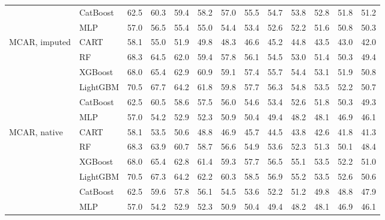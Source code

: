 \begin{table}[p]
\begin{tabular}{@{}llrrrrrrrrrrr@{}}
 & CatBoost & 62.5 & 60.3 & 59.4 & 58.2 & 57.0 & 55.5 & 54.7 & 53.8 & 52.8 & 51.8 & 51.2 \\
 & MLP & 57.0 & 56.5 & 55.4 & 55.0 & 54.4 & 53.4 & 52.6 & 52.2 & 51.6 & 50.8 & 50.3 \\
\midrule
MCAR, imputed & CART & 58.1 & 55.0 & 51.9 & 49.8 & 48.3 & 46.6 & 45.2 & 44.8 & 43.5 & 43.0 & 42.0 \\
 & RF & 68.3 & 64.5 & 62.0 & 59.4 & 57.8 & 56.1 & 54.5 & 53.0 & 51.4 & 50.3 & 49.4 \\
 & XGBoost & 68.0 & 65.4 & 62.9 & 60.9 & 59.1 & 57.4 & 55.7 & 54.4 & 53.1 & 51.9 & 50.8 \\
 & LightGBM & 70.5 & 67.7 & 64.2 & 61.8 & 59.8 & 57.7 & 56.3 & 54.8 & 53.5 & 52.2 & 50.7 \\
 & CatBoost & 62.5 & 60.5 & 58.6 & 57.5 & 56.0 & 54.6 & 53.4 & 52.6 & 51.8 & 50.3 & 49.3 \\
 & MLP & 57.0 & 54.2 & 52.9 & 52.3 & 50.9 & 50.4 & 49.4 & 48.2 & 48.1 & 46.9 & 46.1 \\
\midrule
MCAR, native & CART & 58.1 & 53.5 & 50.6 & 48.8 & 46.9 & 45.7 & 44.5 & 43.8 & 42.6 & 41.8 & 41.3 \\
 & RF & 68.3 & 63.9 & 60.7 & 58.7 & 56.6 & 54.9 & 53.6 & 52.3 & 51.3 & 50.1 & 48.4 \\
 & XGBoost & 68.0 & 65.4 & 62.8 & 61.4 & 59.3 & 57.7 & 56.5 & 55.1 & 53.5 & 52.2 & 51.0 \\
 & LightGBM & 70.5 & 67.3 & 64.2 & 62.2 & 60.3 & 58.5 & 56.9 & 55.2 & 53.5 & 52.6 & 50.6 \\
 & CatBoost & 62.5 & 59.6 & 57.8 & 56.1 & 54.5 & 53.6 & 52.2 & 51.2 & 49.8 & 48.8 & 47.9 \\
 & MLP & 57.0 & 54.2 & 52.9 & 52.3 & 50.9 & 50.4 & 49.4 & 48.2 & 48.1 & 46.9 & 46.1 \\
\bottomrule
\end{tabular}
\end{table}

